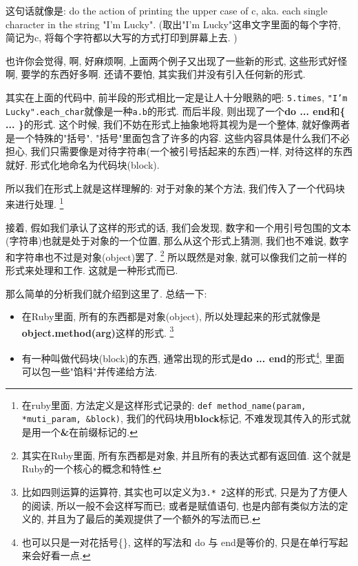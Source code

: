 这句话就像是: do the action of printing the upper case of c, aka. each single character in the string "I'm Lucky". (取出"I'm Lucky"这串文字里面的每个字符, 简记为c, 将每个字符都以大写的方式打印到屏幕上去. )

也许你会觉得, 啊, 好麻烦啊, 上面两个例子又出现了一些新的形式, 这些形式好怪啊, 要学的东西好多啊. 还请不要怕, 其实我们并没有引入任何新的形式. 

其实在上面的代码中, 前半段的形式相比一定是让人十分眼熟的吧: \texttt{5.times}, \texttt{"I'm Lucky".each_char}就像是一种\texttt{a.b}的形式. 而后半段, 则出现了一个\textbf{do ... end}和\textbf{\{ ... \}}的形式. 这个时候, 我们不妨在形式上抽象地将其视为是一个整体, 就好像两者是一个特殊的"括号", "括号"里面包含了许多的内容. 这些内容具体是什么我们不必担心, 我们只需要像是对待字符串(一个被引号括起来的东西)一样, 对待这样的东西就好. 形式化地命名为代码块(block).


所以我们在形式上就是这样理解的: 对于对象的某个方法, 我们传入了一个代码块来进行处理. \footnote{在ruby里面, 方法定义是这样形式记录的: \texttt{def method_name(param, *muti_param, &block)}, 我们的代码块用\textbf{block}标记, 不难发现其传入的形式就是用一个\textbf{\&}在前缀标记的. }

接着, 假如我们承认了这样的形式的话, 我们会发现, 数字和一个用引号包围的文本(字符串)也就是处于对象的一个位置, 那么从这个形式上猜测, 我们也不难说, 数字和字符串也不过是对象(object)罢了. \footnote{其实在Ruby里面, 所有东西都是对象, 并且所有的表达式都有返回值. 这个就是Ruby的一个核心的概念和特性. } 所以既然是对象, 就可以像我们之前一样的形式来处理和工作. 这就是一种形式而已. 

那么简单的分析我们就介绍到这里了. 总结一下: 

\begin{itemize}
  \item 在Ruby里面, 所有的东西都是对象(object), 所以处理起来的形式就像是\textbf{object.method(arg)}这样的形式. \footnote{比如四则运算的运算符, 其实也可以定义为\texttt{3.* 2}这样的形式, 只是为了方便人的阅读, 所以一般不会这样写而已; 或者是赋值语句, 也是内部有类似方法的定义的, 并且为了最后的美观提供了一个额外的写法而已. }
  \item 有一种叫做代码块(block)的东西, 通常出现的形式是\textbf{do ... end}的形式\footnote{也可以只是一对花括号\{\}, 这样的写法和 do 与 end是等价的, 只是在单行写起来会好看一点. }, 里面可以包一些"馅料"并传递给方法. 
\end{itemize}

